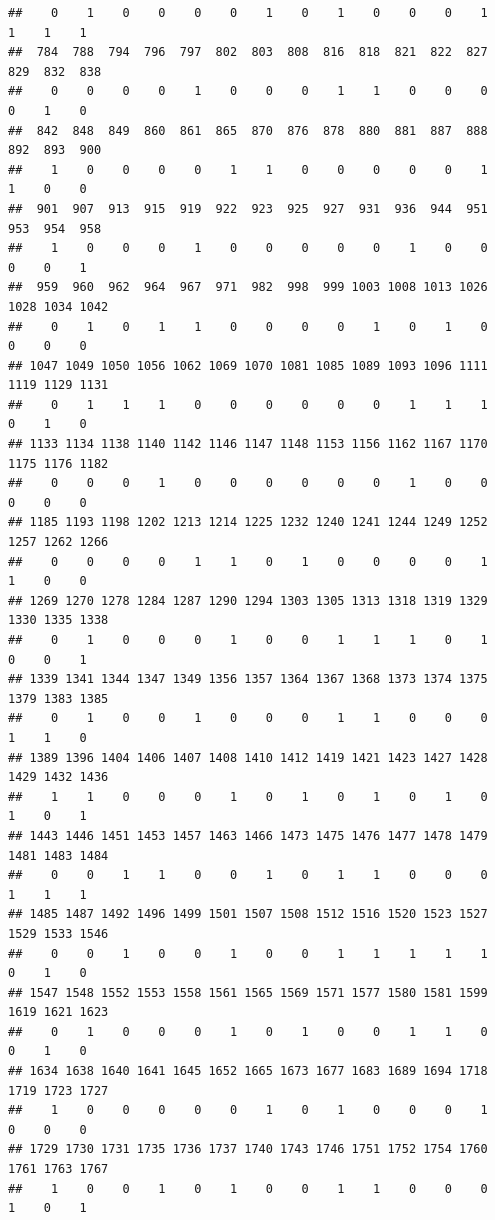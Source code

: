 \documentclass[
]{article}
\begin{document}
\begin{verbatim}
##    0    1    0    0    0    0    1    0    1    0    0    0    1    1    1    1 
##  784  788  794  796  797  802  803  808  816  818  821  822  827  829  832  838 
##    0    0    0    0    1    0    0    0    1    1    0    0    0    0    1    0 
##  842  848  849  860  861  865  870  876  878  880  881  887  888  892  893  900 
##    1    0    0    0    0    1    1    0    0    0    0    0    1    1    0    0 
##  901  907  913  915  919  922  923  925  927  931  936  944  951  953  954  958 
##    1    0    0    0    1    0    0    0    0    0    1    0    0    0    0    1 
##  959  960  962  964  967  971  982  998  999 1003 1008 1013 1026 1028 1034 1042 
##    0    1    0    1    1    0    0    0    0    1    0    1    0    0    0    0 
## 1047 1049 1050 1056 1062 1069 1070 1081 1085 1089 1093 1096 1111 1119 1129 1131 
##    0    1    1    1    0    0    0    0    0    0    1    1    1    0    1    0 
## 1133 1134 1138 1140 1142 1146 1147 1148 1153 1156 1162 1167 1170 1175 1176 1182 
##    0    0    0    1    0    0    0    0    0    0    1    0    0    0    0    0 
## 1185 1193 1198 1202 1213 1214 1225 1232 1240 1241 1244 1249 1252 1257 1262 1266 
##    0    0    0    0    1    1    0    1    0    0    0    0    1    1    0    0 
## 1269 1270 1278 1284 1287 1290 1294 1303 1305 1313 1318 1319 1329 1330 1335 1338 
##    0    1    0    0    0    1    0    0    1    1    1    0    1    0    0    1 
## 1339 1341 1344 1347 1349 1356 1357 1364 1367 1368 1373 1374 1375 1379 1383 1385 
##    0    1    0    0    1    0    0    0    1    1    0    0    0    1    1    0 
## 1389 1396 1404 1406 1407 1408 1410 1412 1419 1421 1423 1427 1428 1429 1432 1436 
##    1    1    0    0    0    1    0    1    0    1    0    1    0    1    0    1 
## 1443 1446 1451 1453 1457 1463 1466 1473 1475 1476 1477 1478 1479 1481 1483 1484 
##    0    0    1    1    0    0    1    0    1    1    0    0    0    1    1    1 
## 1485 1487 1492 1496 1499 1501 1507 1508 1512 1516 1520 1523 1527 1529 1533 1546 
##    0    0    1    0    0    1    0    0    1    1    1    1    1    0    1    0 
## 1547 1548 1552 1553 1558 1561 1565 1569 1571 1577 1580 1581 1599 1619 1621 1623 
##    0    1    0    0    0    1    0    1    0    0    1    1    0    0    1    0 
## 1634 1638 1640 1641 1645 1652 1665 1673 1677 1683 1689 1694 1718 1719 1723 1727 
##    1    0    0    0    0    0    1    0    1    0    0    0    1    0    0    0 
## 1729 1730 1731 1735 1736 1737 1740 1743 1746 1751 1752 1754 1760 1761 1763 1767 
##    1    0    0    1    0    1    0    0    1    1    0    0    0    1    0    1 

\end{verbatim}
\end{document}
